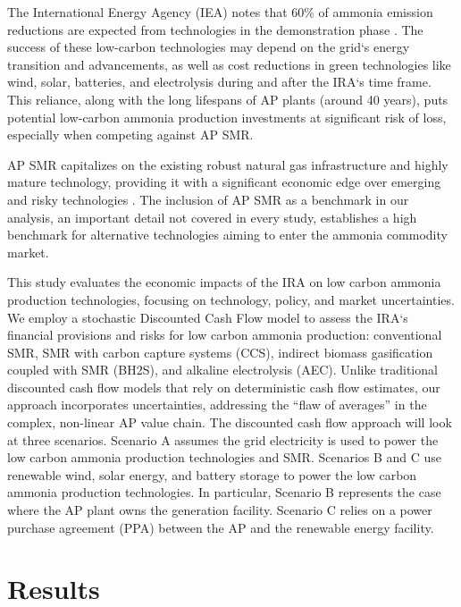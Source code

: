 \documentclass{article}
\begin{document}
The International Energy Agency (IEA) notes that 60\% of ammonia emission reductions are expected from technologies in the demonstration phase \cite{IEA2021}. The success of these low-carbon technologies may depend on the grid‘s energy transition and advancements, as well as cost reductions in green technologies like wind, solar, batteries, and electrolysis during and after the IRA‘s time frame. This reliance, along with the long lifespans of AP plants (around 40 years), puts potential low-carbon ammonia production investments at significant risk of loss, especially when competing against AP SMR.

AP SMR capitalizes on the existing robust natural gas infrastructure and highly mature technology, providing it with a significant economic edge over emerging and risky technologies \cite{IEA2021}. The inclusion of AP SMR as a benchmark in our analysis, an important detail not covered in every study, establishes a high benchmark for alternative technologies aiming to enter the ammonia commodity market. 

This study evaluates the economic impacts of the IRA on low carbon ammonia production technologies, focusing on technology, policy, and market uncertainties. We employ a stochastic Discounted Cash Flow model to assess the IRA‘s financial provisions and risks for low carbon ammonia production: conventional SMR, SMR with carbon capture systems (CCS), indirect biomass gasification coupled with SMR (BH2S), and alkaline electrolysis (AEC). Unlike traditional discounted cash flow models that rely on deterministic cash flow estimates, our approach incorporates uncertainties, addressing the ``flaw of averages'' \cite{Savage2010} in the complex, non-linear AP value chain. The  discounted cash flow approach will look at three scenarios. Scenario A assumes the grid electricity is used to power the low carbon ammonia production technologies and SMR. Scenarios B and C use renewable wind, solar energy, and battery storage to power the low carbon ammonia production technologies. In particular, Scenario B represents the case where the AP plant owns the generation facility. Scenario C relies on a power purchase agreement (PPA) between the AP and the renewable energy facility.

\section*{Results}
\end{document}
